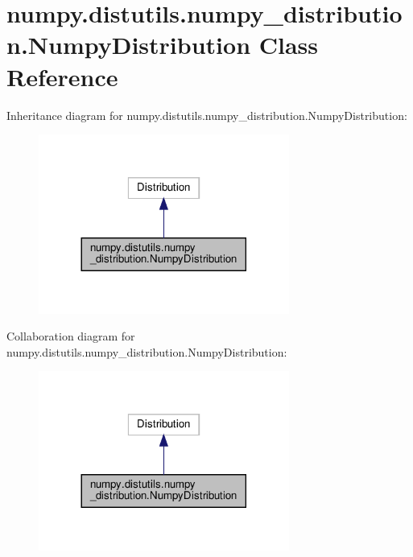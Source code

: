 \hypertarget{classnumpy_1_1distutils_1_1numpy__distribution_1_1NumpyDistribution}{}\section{numpy.\+distutils.\+numpy\+\_\+distribution.\+Numpy\+Distribution Class Reference}
\label{classnumpy_1_1distutils_1_1numpy__distribution_1_1NumpyDistribution}


Inheritance diagram for numpy.\+distutils.\+numpy\+\_\+distribution.\+Numpy\+Distribution\+:
\nopagebreak
\begin{figure}[H]
\begin{center}
\leavevmode
\includegraphics[width=233pt]{classnumpy_1_1distutils_1_1numpy__distribution_1_1NumpyDistribution__inherit__graph}
\end{center}
\end{figure}


Collaboration diagram for numpy.\+distutils.\+numpy\+\_\+distribution.\+Numpy\+Distribution\+:
\nopagebreak
\begin{figure}[H]
\begin{center}
\leavevmode
\includegraphics[width=233pt]{classnumpy_1_1distutils_1_1numpy__distribution_1_1NumpyDistribution__coll__graph}
\end{center}
\end{figure}
